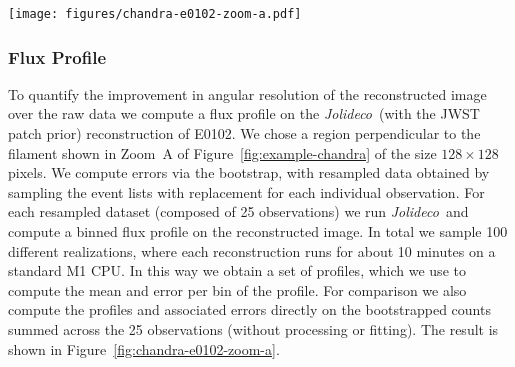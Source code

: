 \documentclass[twocolumn, lineno]{aastex631}
\newcommand{\jolideco}{\textit{Jolideco}~}
\begin{document}
    \begin{figure*}
        \begin{centering}
            \texttt{[image: figures/chandra-e0102-zoom-a.pdf]}
            \caption{
                The left panel shows the deconvolved flux and counts profile of the region illustrated in the right panel. The thick solid and dashed lines represent the mean across the 100 bootstrap-resampled datasets. The counts profile for each bootstrapped dataset is summed (stacked) across the 25 observations per dataset, while the \jolideco profile is computed from a single joint reconstruction based on all 25 observations. The variability across the 100 bootstrapped datasets is represented by the $3\sigma$ error bands, shown transparent in the background for both profiles. Both profiles are normalized such that they integrate to unity and are aligned such that the position of their peak coincides. 
            }
            \label{fig:chandra-e0102-zoom-a}
        \end{centering}
    \end{figure*}
    
    \subsubsection{Flux Profile}
    To quantify the improvement in angular resolution of the reconstructed image over the raw data we compute a flux profile on the \jolideco (with the JWST patch prior) reconstruction of E0102. We chose a region perpendicular to the filament shown in Zoom~A of Figure~\ref{fig:example-chandra} of the size $128\times128$ pixels. We compute errors via the bootstrap, with resampled data obtained by sampling the event lists with replacement for each individual observation. For each resampled dataset (composed of 25 observations) we run \jolideco and compute a binned flux profile on the reconstructed image. In total we sample 100 different realizations, where each reconstruction runs for about 10 minutes on a standard M1 CPU. In this way we obtain a set of profiles, which we use to compute the mean and error per bin of the profile. For comparison we also compute the profiles and associated errors directly on the bootstrapped counts summed across the 25 observations (without processing or fitting). The result is shown in Figure~\ref{fig:chandra-e0102-zoom-a}.
\end{document}
